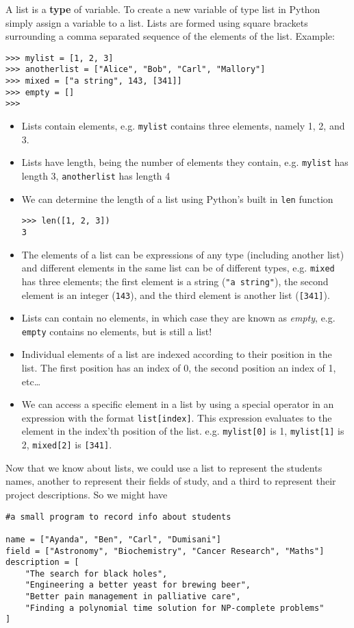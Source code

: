 A list is a \textbf{type} of variable. To create a new   variable of type list in Python simply assign a variable to a list.   Lists are formed using square brackets surrounding a comma separated   sequence of the elements of the list.  Example:
\begin{lstlisting}
>>> mylist = [1, 2, 3]
>>> anotherlist = ["Alice", "Bob", "Carl", "Mallory"]
>>> mixed = ["a string", 143, [341]]
>>> empty = []
>>>
\end{lstlisting}
\begin{itemize}
	\item Lists contain elements, e.g. \texttt{mylist} contains three elements,    namely 1, 2, and 3.
	\item Lists have length, being the number of elements they contain,    e.g. \texttt{mylist} has length 3, \texttt{anotherlist} has length 4
	\item We can determine the length of a list using Python's built in    \texttt{len}    function
\begin{lstlisting}
>>> len([1, 2, 3])
3
\end{lstlisting}
	\item The elements of a list can be expressions of any type    (including another list) and different elements in the same list    can be of different types, e.g. \texttt{mixed} has three elements; the    first element is a string (\texttt{"a string"}), the second element is an    integer (\texttt{143}), and the third element is another list (\texttt{[341]}).
	\item Lists can contain no elements, in which case they are known as    \textit{empty}, e.g. \texttt{empty} contains no elements, but is still a list!
	\item Individual elements of a list are indexed according to their    position in the list. The first position has an index of 0, the    second position an index of 1, etc\ldots
	\item We can access a specific element in a list by using a special    operator in an expression with the format    
\texttt{list[index]}. This expression evaluates to the element    in the index'th position of the list. e.g. 
\texttt{mylist[0]}    is 1, 
\texttt{mylist[1]} is 2, 
\texttt{mixed[2]} is    \texttt{[341]}.
\end{itemize}

Now that we know about lists, we could use a list to represent the   students names, another to represent their fields of study, and a third   to represent their project descriptions. So we might have
\begin{lstlisting}
#a small program to record info about students

name = ["Ayanda", "Ben", "Carl", "Dumisani"]
field = ["Astronomy", "Biochemistry", "Cancer Research", "Maths"]
description = [
    "The search for black holes",
    "Engineering a better yeast for brewing beer",
    "Better pain management in palliative care",
    "Finding a polynomial time solution for NP-complete problems"
]
\end{lstlisting}

